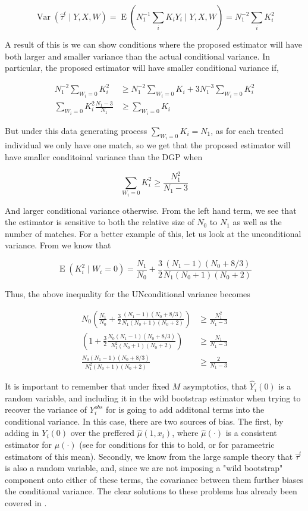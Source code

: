 \documentclass{article}
\DeclareMathOperator{\E}{E}
\DeclareMathOperator{\Var}{Var}
\newcommand{\hta}{\hat \tau^{t}}
\begin{document}
$$\Var(\hta \mid Y,X,W) = \E(N_{1}^{-1}\sum_{i}K_{i}Y_{i} \mid Y,X,W) = N_{1}^{-2}\sum_{i}K_{i}^{2}$$

A result of this is we can show conditions where the proposed estimator will have both larger and smaller variance than the actual conditional variance. In particular, the proposed estimator will have smaller conditional variance if,

\begin{align*} N_{1}^{-2}\sum_{W_{i}=0}K_{i}^{2} &\geq N_{1}^{-2}\sum_{W_{i}=0}K_{i}+3N_{1}^{-3}\sum_{W_{i}=0}K_{i}^{2} \\
\sum_{W_{i}=0}K_{i}^{2}\frac{N_{1}-3}{N_{1}} &\geq \sum_{W_{i}=0}K_{i}
\end{align*}

But under this data generating process $\sum_{W_{i}=0}K_{i} = N_{1}$, as for each treated individual we only have one match, so we get that the proposed estimator will have smaller conditoinal variance than the DGP when

$$\sum_{W_{i}=0}K_{i}^{2} \geq \frac{N_{1}^{2}}{N_{1}-3}$$

And larger conditional variance otherwise. From the left hand term, we see that the estimator is sensitive to both the relative size of $N_{0}$ to $N_{1}$ as well as the number of matches. For a better example of this, let us look at the unconditional variance. From \cite{AnI:08} we know that

$$\E(K_{i}^{2} \mid W_{i}=0) = \frac{N_{1}}{N_{0}}+\frac{3}{2}\frac{(N_{1}-1)(N_{0}+8/3)}{N_{1}(N_{0}+1)(N_{0}+2)}$$

Thus, the above inequality for the UNconditional variance becomes

\begin{align*} N_{0}\left(\frac{N_{1}}{N_{0}}+\frac{3}{2}\frac{(N_{1}-1)(N_{0}+8/3)}{N_{1}(N_{0}+1)(N_{0}+2)}\right) &\geq \frac{N_{1}^{2}}{N_{1}-3} \\
\left(1+\frac{3}{2}\frac{N_{0}(N_{1}-1)(N_{0}+8/3)}{N_{1}^{2}(N_{0}+1)(N_{0}+2)}\right) &\geq \frac{N_{1}}{N_{1}-3} \\
\frac{N_{0}(N_{1}-1)(N_{0}+8/3)}{N_{1}^{2}(N_{0}+1)(N_{0}+2)} &\geq \frac{2}{N_{1}-3}
\end{align*}

It is important to remember that under fixed $M$ asymptotics, that $\hat Y_{i}(0)$ is a random variable, and including it in the wild bootstrap estimator when trying to recover the variance of $Y_{i}^{obs}$ for is going to add additonal terms into the conditional variance. In this case, there are two sources of bias. The first, by adding in $Y_{i}(0)$ over the preffered $\hat \mu(1,x_{i})$, where $\hat \mu(\cdot)$ is a consistent estimator for $\mu(\cdot)$ (see \cite{AnI:06} for conditions for this to hold, or \cite{InR:15} for parameetric estimators of this mean). Secondly, we know from the large sample theory that $\hat \tau^{t}$ is also a random variable, and, since we are not imposing a "wild bootstrap" component onto either of these terms, the covariance between them further biases the conditional variance. The clear solutions to these problems has already been covered in \cite{OnR:16}.



\printbibliography
\end{document}

